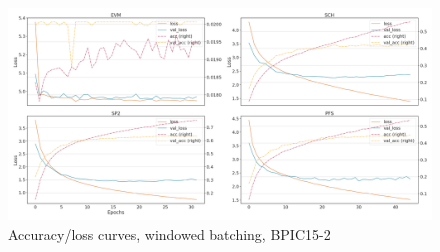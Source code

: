 \begin{figure}[!htb]
    \centering
    \includegraphics[width=\textwidth]{gfx/bpic2015_2/windowed_loss_acc_curve.png}
    \caption{Accuracy/loss curves, windowed batching, BPIC15-2}
\end{figure}
\FloatBarrier

